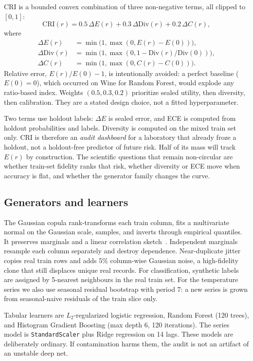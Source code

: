 \documentclass[conference]{IEEEtran}
\begin{document}
CRI is a bounded convex combination of three non-negative terms, all clipped to $[0,1]$:
\begin{equation}
\mathrm{CRI}(r)=0.5\,\Delta E(r)+0.3\,\Delta\mathrm{Div}(r)+0.2\,\Delta C(r),
\label{eq:cri}
\end{equation}
where
\begin{align}
\Delta E(r)&=\min\bigl(1,\max(0,E(r)-E(0))\bigr),\\
\Delta\mathrm{Div}(r)&=\min\bigl(1,\max(0,1-\mathrm{Div}(r)/\mathrm{Div}(0))\bigr),\\
\Delta C(r)&=\min\bigl(1,\max(0,C(r)-C(0))\bigr).
\end{align}
Relative error, $E(r)/E(0)-1$, is intentionally avoided: a perfect baseline ($E(0)=0$), which occurred on Wine for Random Forest, would explode any ratio-based index.
Weights $(0.5,0.3,0.2)$ prioritize sealed utility, then diversity, then calibration.
They are a stated design choice, not a fitted hyperparameter.

Two terms use holdout labels: $\Delta E$ is sealed error, and ECE is computed from holdout probabilities and labels.
Diversity is computed on the mixed train set only.
CRI is therefore an \emph{audit dashboard} for a laboratory that already froze a holdout, not a holdout-free predictor of future risk.
Half of its mass will track $E(r)$ by construction.
The scientific questions that remain non-circular are whether train-set fidelity ranks that risk, whether diversity or ECE move when accuracy is flat, and whether the generator family changes the curve.

\subsection{Generators and learners}
The Gaussian copula rank-transforms each train column, fits a multivariate normal on the Gaussian scale, samples, and inverts through empirical quantiles.
It preserves marginals and a linear correlation sketch~\cite{patki2016sdv}.
Independent marginals resample each column separately and destroy dependence.
Near-duplicate jitter copies real train rows and adds 5\% column-wise Gaussian noise, a high-fidelity clone that still displaces unique real records.
For classification, synthetic labels are assigned by 5-nearest neighbours in the real train set.
For the temperature series we also use seasonal residual bootstrap with period 7: a new series is grown from seasonal-naive residuals of the train slice only.

Tabular learners are $L_2$-regularized logistic regression, Random Forest (120 trees), and Histogram Gradient Boosting (max depth 6, 120 iterations).
The series model is \texttt{StandardScaler} plus Ridge regression on 14 lags.
These models are deliberately ordinary.
If contamination harms them, the audit is not an artifact of an unstable deep net.
\end{document}
